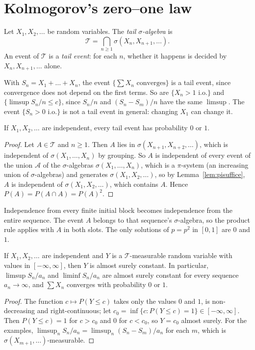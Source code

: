 \section{Kolmogorov's zero--one law}

\begin{definition}
Let $X_1,X_2,\dots$ be random variables. The \emph{tail $\sigma$-algebra} is
\[
\mathcal T=\bigcap_{n\ge1}\sigma(X_n,X_{n+1},\dots).
\]
An event of $\mathcal T$ is a \emph{tail event}: for each $n$, whether it happens is decided by $X_n,X_{n+1},\dots$ alone.
\end{definition}

With $S_n=X_1+\dots+X_n$, the event $\{\sum X_n\text{ converges}\}$ is a tail event, since convergence does not depend on
the first terms. So are $\{X_n>1\text{ i.o.}\}$ and $\{\limsup S_n/n\le c\}$, since $S_n/n$ and $(S_n-S_m)/n$ have the same
$\limsup$. The event $\{S_n>0\text{ i.o.}\}$ is not a tail event in general: changing $X_1$ can change it.

\begin{theorem}\label{thm:kolmogorov01}
If $X_1,X_2,\dots$ are independent, every tail event has probability $0$ or $1$.
\end{theorem}
\begin{proof}
Let $A\in\mathcal T$ and $n\ge1$. Then $A$ lies in $\sigma(X_{n+1},X_{n+2},\dots)$, which is independent of $\sigma(X_1,\dots,X_n)$ by
grouping. So $A$ is independent of every event of the union $\mathcal A$ of the $\sigma$-algebras $\sigma(X_1,\dots,X_n)$, which is a
$\pi$-system (an increasing union of $\sigma$-algebras) and generates $\sigma(X_1,X_2,\dots)$, so by Lemma~\ref{lem:pisuffice},
$A$ is independent of $\sigma(X_1,X_2,\dots)$, which contains $A$. Hence $P(A)=P(A\cap A)=P(A)^2$.
\end{proof}

Independence from every finite initial block becomes independence from the entire sequence. The event $A$ belongs to that sequence's $\sigma$-algebra, so the product rule applies with $A$ in both slots. The only solutions of $p=p^2$ in $[0,1]$ are $0$ and $1$.

\begin{corollary}\label{cor:tailconst}
If $X_1,X_2,\dots$ are independent and $Y$ is a $\mathcal T$-measurable random variable with values in $[-\infty,\infty]$,
then $Y$ is almost surely constant. In particular, $\limsup S_n/a_n$ and $\liminf S_n/a_n$ are almost surely constant for
every sequence $a_n\to\infty$, and $\sum X_n$ converges with probability $0$ or $1$.
\end{corollary}
\begin{proof}
The function $c\mapsto P(Y\le c)$ takes only the values $0$ and $1$, is non-decreasing and right-continuous; let
$c_0=\inf\{c:P(Y\le c)=1\}\in[-\infty,\infty]$. Then $P(Y\le c)=1$ for $c>c_0$ and $0$ for $c<c_0$, so $Y=c_0$ almost surely.
For the examples, $\limsup_n S_n/a_n=\limsup_n(S_n-S_m)/a_n$ for each $m$, which is $\sigma(X_{m+1},\dots)$-measurable.
\end{proof}

